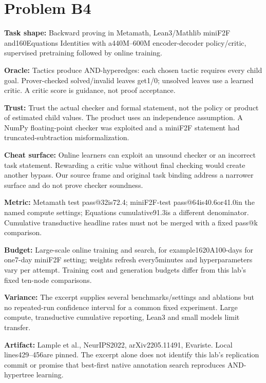 \documentclass[11pt]{article}
\begin{document}
\section*{Problem B4}\label{ans:B4}
\begin{answer}
\textbf{Task shape:} Backward proving in Metamath, Lean3/Mathlib miniF2F and160Equations Identities with a440M--600M encoder-decoder policy/critic, supervised pretraining followed by online training.

\textbf{Oracle:} Tactics produce AND-hyperedges: each chosen tactic requires every child goal. Prover-checked solved/invalid leaves get1/0; unsolved leaves use a learned critic. A critic score is guidance, not proof acceptance.

\textbf{Trust:} Trust the actual checker and formal statement, not the policy or product of estimated child values. The product uses an independence assumption. A NumPy floating-point checker was exploited and a miniF2F statement had truncated-subtraction misformalization.

\textbf{Cheat surface:} Online learners can exploit an unsound checker or an incorrect task statement. Rewarding a critic value without final checking would create another bypass. Our source frame and original task binding address a narrower surface and do not prove checker soundness.

\textbf{Metric:} Metamath test pass@32is72.4; miniF2F-test pass@64is40.6or41.0in the named compute settings; Equations cumulative91.3is a different denominator. Cumulative transductive headline rates must not be merged with a fixed pass@k comparison.

\textbf{Budget:} Large-scale online training and search, for example1620A100-days for one7-day miniF2F setting; weights refresh every5minutes and hyperparameters vary per attempt. Training cost and generation budgets differ from this lab's fixed ten-node comparisons.

\textbf{Variance:} The excerpt supplies several benchmarks/settings and ablations but no repeated-run confidence interval for a common fixed experiment. Large compute, transductive cumulative reporting, Lean3 and small models limit transfer.

\textbf{Artifact:} Lample et al., NeurIPS2022, arXiv2205.11491, Evariste. Local lines429--456are pinned. The excerpt alone does not identify this lab's replication commit or promise that best-first native annotation search reproduces AND-hypertree learning.

\end{answer}
\end{document}
